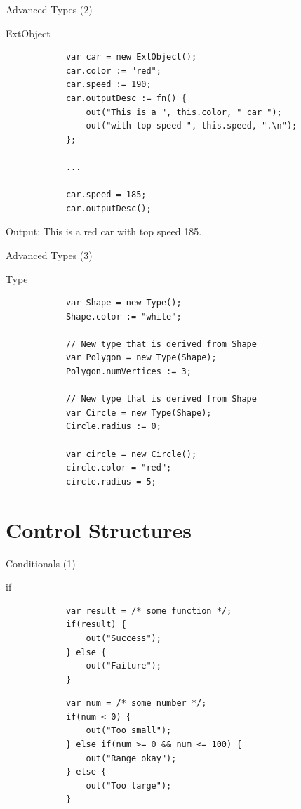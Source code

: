 \documentclass[ucs,9pt]{beamer}
\begin{document}
\begin{frame}[fragile]{Advanced Types (2)}
	\begin{block}{ExtObject}
		\begin{lstlisting}
			var car = new ExtObject();
			car.color := "red";
			car.speed := 190;
			car.outputDesc := fn() {
			    out("This is a ", this.color, " car ");
			    out("with top speed ", this.speed, ".\n");
			};

			...

			car.speed = 185;
			car.outputDesc();
		\end{lstlisting}
	\end{block}
	Output: This is a red car with top speed 185.
\end{frame}

\begin{frame}[fragile]{Advanced Types (3)}
	\begin{block}{Type}
		\begin{lstlisting}
			var Shape = new Type();
			Shape.color := "white";

			// New type that is derived from Shape
			var Polygon = new Type(Shape); 
			Polygon.numVertices := 3;

			// New type that is derived from Shape
			var Circle = new Type(Shape); 
			Circle.radius := 0;

			var circle = new Circle();
			circle.color = "red";
			circle.radius = 5;
		\end{lstlisting}
	\end{block}
\end{frame}
 
\section{Control Structures}
\begin{frame}[fragile]{Conditionals (1)}
	\begin{block}{if}
		\begin{lstlisting}
			var result = /* some function */;
			if(result) {
			    out("Success");
			} else {
			    out("Failure");
			}
		\end{lstlisting}
		\begin{lstlisting}
			var num = /* some number */;
			if(num < 0) {
			    out("Too small");
			} else if(num >= 0 && num <= 100) {
			    out("Range okay");
			} else {
			    out("Too large");
			}
		\end{lstlisting}
	\end{block}
\end{frame}
\end{document}
